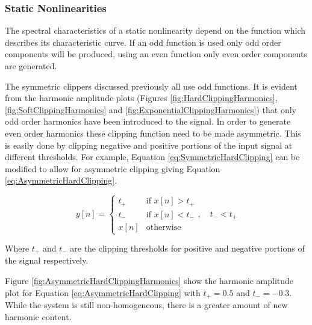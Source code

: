		\subsubsection*{Static Nonlinearities}
			The spectral characteristics of a static nonlinearity depend on the function which describes its
			characteristic curve. If an odd function is used only odd order components will be produced, using
			an even function only even order components are generated. 

			The symmetric clippers discussed previously all use odd functions. It is evident from the harmonic
			amplitude plots (Figures \ref{fig:HardClippingHarmonics}, \ref{fig:SoftClippingHarmonics} and
			\ref{fig:ExponentialClippingHarmonics}) that only odd order harmonics have been introduced to the
			signal. In order to generate even order harmonics these clipping function need to be made
			asymmetric. This is easily done by clipping negative and positive portions of the input signal at
			different thresholds. For example, Equation \ref{eq:SymmetricHardClipping} can be modified to allow
			for asymmetric clipping giving Equation \ref{eq:AsymmetricHardClipping}.
			
			\begin{equation}
				y[n] = \begin{cases}
					t_{+} & \text{if $x[n] > t_{+}$} \\
					t_{-} & \text{if $x[n] < t_{-}$} \\
					x[n] & \text{otherwise}
				\end{cases}, \quad t_{-} < t_{+}
				\label{eq:AsymmetricHardClipping}
			\end{equation}

			Where $t_{+}$ and $t_{-}$ are the clipping thresholds for positive and negative portions of the
			signal respectively.	

			Figure \ref{fig:AsymmetricHardClippingHarmonics} show the harmonic amplitude plot for Equation
			\ref{eq:AsymmetricHardClipping} with $t_{+} = 0.5$ and $t_{-} = -0.3$. While the system is still
			non-homogeneous, there is a greater amount of new harmonic content.

